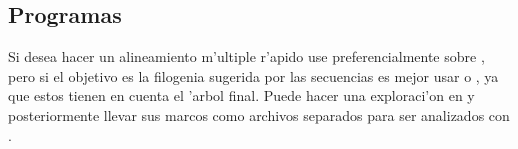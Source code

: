 % 

\subsection{Programas}
Si desea hacer un alineamiento m'ultiple r'apido use preferencialmente  sobre , pero si el objetivo es la filogenia sugerida por las 
secuencias es mejor usar  o , ya que estos tienen en cuenta el 'arbol final. Puede hacer una 
exploraci'on en  y posteriormente llevar sus marcos como archivos separados para ser analizados con .

